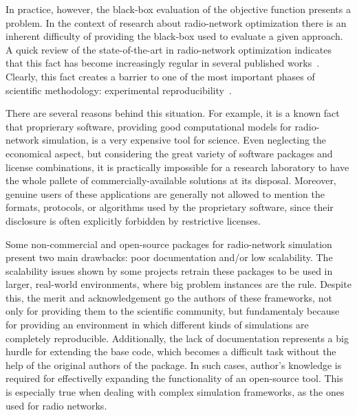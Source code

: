 \bigskip{}


In practice, however, the black-box evaluation of the objective function
presents a problem. In the context of research about radio-network
optimization there is an inherent difficulty of providing the black-box
used to evaluate a given approach. A quick review of the state-of-the-art
in radio-network optimization indicates that this fact has become
increasingly regular in several published works~\cite{amaldi2007radio_planning,chen2008automated,chen2009fast,gordejuela2009two,siomina2008enhancing,siomina2007minimum_pilot_power}.
Clearly, this fact creates a barrier to one of the most important
phases of scientific methodology: experimental reproducibility~\cite{gauch2002scientific}. 

There are several reasons behind this situation. For example, it is
a known fact that proprierary software, providing good computational
models for radio-network simulation, is a very expensive tool for
science. Even neglecting the economical aspect, but considering the
great variety of software packages and license combinations, it is
practically impossible for a research laboratory to have the whole
pallete of commercially-available solutions at its disposal. Moreover,
genuine users of these applications are generally not allowed to mention
the formats, protocols, or algorithms used by the proprietary software,
since their disclosure is often explicitly forbidden by restrictive
licenses.

Some non-commercial and open-source packages for radio-network simulation~\cite{Mehlfuhrer_The_Vienna_LTE_Simulators_enabling_reproducibility_in_wireless_communications_research:2011,Momentum.project,Ozimek_Open.source.radio.coverage.prediction:2010,Pillekeit-A_hybrid_simulation_framework_for_the_evaluation_of_common_RRM:2012,Piro_Simulating_LTE_cellular_systems_an_open_source_framework:2011,Yeung-Detailed_OFDM_modeling_in_network_simulation:2004}
present two main drawbacks: poor documentation and/or low scalability.
The scalability issues shown by some projects retrain these packages
to be used in larger, real-world environments, where big problem instances
are the rule. Despite this, the merit and acknowledgement go the authors
of these frameworks, not only for providing them to the scientific
community, but fundamentaly because for providing an environment in
which different kinds of simulations are completely reproducible.
Additionally, the lack of documentation represents a big hurdle for
extending the base code, which becomes a difficult task without the
help of the original authors of the package. In such cases, author's
knowledge is required for effectivelly expanding the functionality
of an open-source tool. This is especially true when dealing with
complex simulation frameworks, as the ones used for radio networks.


